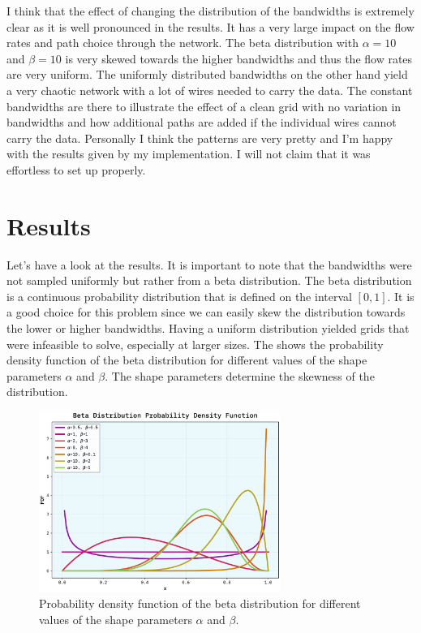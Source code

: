 \documentclass[10pt, titlepage, a4paper]{article}
\begin{document}
I think that the effect of changing the distribution of the bandwidths is extremely clear as it is well pronounced in the
results. It has a very large impact on the flow rates and path choice through the network. The beta distribution with
$\alpha = 10$ and $\beta = 10$ is very skewed towards the higher bandwidths and thus the flow rates are very uniform. The uniformly 
distributed bandwidths on the other hand yield a very chaotic network with a lot of wires needed to carry the data. The constant
bandwidths are there to illustrate the effect of a clean grid with no variation in bandwidths and how additional paths are added if the 
individual wires cannot carry the data. Personally I think the patterns are very pretty and I'm happy with the results given by my implementation.
I will not claim that it was effortless to set up properly. \\


\section{Results}
Let's have a look at the results. It is important to note 
that the bandwidths were not sampled uniformly but rather from a beta distribution. The beta distribution is a 
continuous probability distribution that is defined on the interval $[0, 1]$. It is a good choice for this problem
since we can easily skew the distribution towards the lower or higher bandwidths. Having a uniform distribution yielded 
grids that were infeasible to solve, especially at larger sizes. The \textcolor{red}{} shows the probability density function
of the beta distribution for different values of the shape parameters $\alpha$ and $\beta$. The shape parameters determine
the skewness of the distribution. 

\begin{figure}[H]
    \centering
    \includegraphics[width=0.7\textwidth]{../Images/beta_dist.pdf}
    \caption{Probability density function of the beta distribution for different values of the shape parameters $\alpha$ and $\beta$.}
    \label{fig:beta_dist}
\end{figure}
\end{document}
